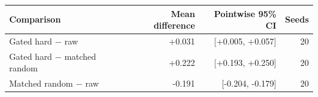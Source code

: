 \begin{tabular}{lrrr}
\toprule
Comparison & Mean difference & Pointwise 95\% CI & Seeds \\
\midrule
Gated hard $-$ raw & +0.031 & [+0.005, +0.057] & 20 \\
Gated hard $-$ matched random & +0.222 & [+0.193, +0.250] & 20 \\
Matched random $-$ raw & -0.191 & [-0.204, -0.179] & 20 \\
\bottomrule
\end{tabular}
